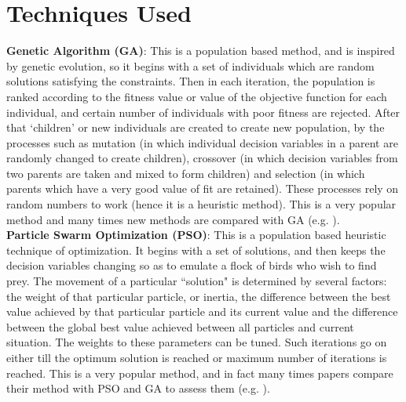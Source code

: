 \section{Techniques Used} \label{sec:tech}
\textbf{Genetic Algorithm (GA)}: This is a population based method, and is inspired by genetic evolution, so it begins with a set of individuals which are random solutions satisfying the constraints. Then in each iteration, the population is ranked according to the fitness value or value of the objective function for each individual, and certain number of individuals with poor fitness are rejected. After that `children' or new individuals are created to create new population, by the processes such as mutation (in which individual decision variables in a parent are randomly changed to create children), crossover (in which decision variables from two parents are taken and mixed to form children) and selection (in which parents which have a very good value of fit are retained). These processes rely on random numbers to work (hence it is a heuristic method). This is a very popular method and many times new methods are compared with GA (e.g. \citep{mgrj57}).\\
\textbf{Particle Swarm Optimization (PSO)}: This is a population based heuristic technique of optimization. It begins with a set of solutions, and then keeps the decision variables changing so as to emulate a flock of birds who wish to find prey. The movement of a particular ``solution" is determined by several factors: the weight of that particular particle, or inertia, the difference between the best value achieved by that particular particle and its current value and the difference between the global best value achieved between all particles and current situation. The weights to these parameters can be tuned. Such iterations go on either till the optimum solution is reached or maximum number of iterations is reached. This is a very popular method, and in fact many times papers compare their method with PSO and GA to assess them (e.g. \citep{mgrj16}).\\
